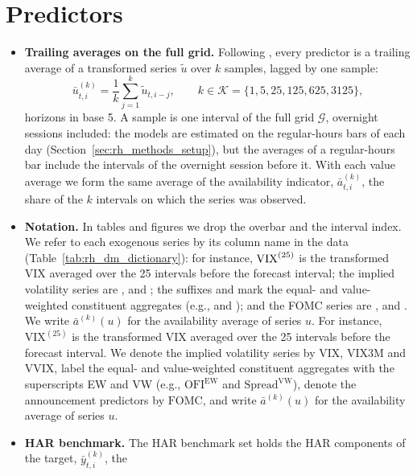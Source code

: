 


\section{Predictors}
\label{sec:rh_predictors}
\begin{itemize}
\item \textbf{Trailing averages on the full grid.} Following \citet{Corsi2009}, every predictor is a trailing average
  of a transformed series $\tilde u$ over $k$ samples, lagged by one sample:
  \[
    \bar u^{(k)}_{t,i} = \frac{1}{k} \sum_{j=1}^{k} \tilde u_{t,i-j}, \qquad
    k \in \mathcal{K} = \{1, 5, 25, 125, 625, 3125\},
  \]
  \rhdmNHorizonsPooled{} horizons in base 5. A sample is one interval of the full grid $\mathcal{G}$, overnight
  sessions included: the models are estimated on the \rhorNBars{} regular-hours bars of each day
  (Section~\ref{sec:rh_methods_setup}), but the averages of a regular-hours bar include the intervals of the
  overnight session before it. With each value average we form the same average of the availability indicator,
  $\bar a^{(k)}_{t,i}$, the share of the $k$ intervals on which the series was observed.
\item \textbf{Notation.} In tables and figures we drop the overbar and the interval index.
  \ifrawseries
  We refer to each exogenous series by its column name in the data (Table~\ref{tab:rh_dm_dictionary}): for instance,
  $\ser{vix}{\mathrm{VIX}}^{(25)}$ is the transformed VIX averaged over the 25 intervals before the forecast
  interval; the implied volatility series are ,  and ; the suffixes
   and  mark the equal- and value-weighted constituent aggregates (e.g.,
   and ); and the FOMC series are ,
   and . We write $\bar a^{(k)}(u)$ for the availability average of
  series $u$.
  \else
  For instance, $\mathrm{VIX}^{(25)}$ is the transformed VIX averaged over the 25 intervals before the forecast
  interval. We denote the implied volatility series by $\mathrm{VIX}$, $\mathrm{VIX3M}$ and $\mathrm{VVIX}$, label
  the equal- and value-weighted constituent aggregates with the superscripts EW and VW (e.g.,
  $\mathrm{OFI}^{\mathrm{EW}}$ and $\mathrm{Spread}^{\mathrm{VW}}$), denote the announcement predictors by
  $\mathrm{FOMC}$, and write $\bar a^{(k)}(u)$ for the availability average of series $u$.
  \fi
\item \textbf{HAR benchmark.} The HAR benchmark set holds the HAR components of the target, $\bar y^{(k)}_{t,i}$, the

\end{itemize}
